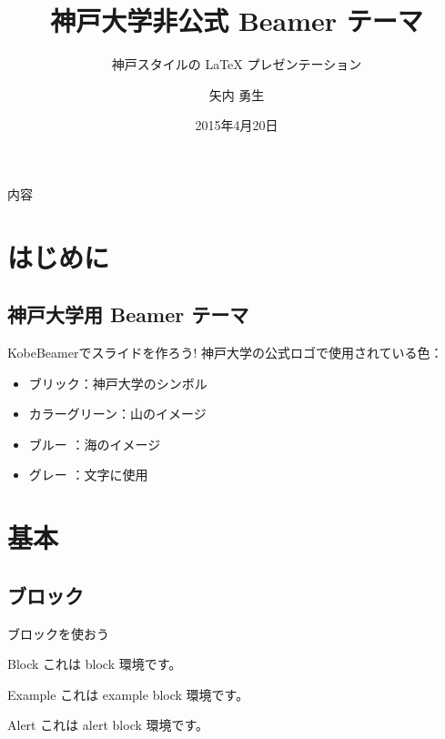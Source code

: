 \documentclass[dvipdfmx]{beamer}
\title[KobeBeamer]{神戸大学非公式 Beamer テーマ}
\subtitle{神戸スタイルの {\LaTeX} プレゼンテーション}
\author{矢内 勇生}
\institute{法学研究科}
\date{2015年4月20日}
\begin{document}
\begin{frame}
 \maketitle
\end{frame}

\begin{frame}{内容} 
  \tableofcontents
\end{frame}

\section{はじめに}
\subsection{神戸大学用 Beamer テーマ}

\begin{frame}{KobeBeamerでスライドを作ろう!}
 神戸大学の公式ロゴで使用されている色：
  \begin{itemize}
    \item \textcolor{kobebrick}{ブリック}：神戸大学のシンボル
    \item \textcolor{kobegreen}カラー{グリーン}：山のイメージ
    \item \textcolor{kobeblue}{ブルー} ：海のイメージ
    \item \textcolor{kobegray}{グレー} ：文字に使用
  \end{itemize}
\end{frame}



\section{基本}


\subsection{ブロック}

\begin{frame}{ブロックを使おう}
  \begin{block}{Block}
   これは block 環境です。
  \end{block}
  \pause
  \begin{exampleblock}{Example}
   これは example block 環境です。 
  \end{exampleblock}
 \pause
  \begin{alertblock}{Alert}
   これは alert block 環境です。
  \end{alertblock}
\end{frame}
\end{document}
